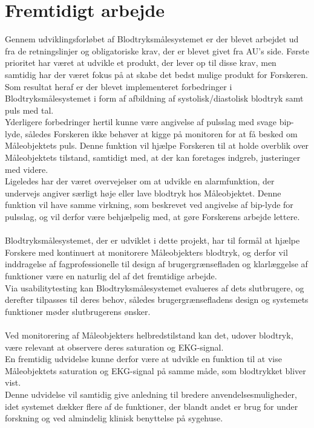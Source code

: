 \section{Fremtidigt arbejde}
Gennem udviklingsforløbet af Blodtryksmålesystemet er der blevet arbejdet ud fra de retningslinjer og obligatoriske krav, der er blevet givet fra AU’s side. Første prioritet har været at udvikle et produkt, der lever op til disse krav, men samtidig har der været fokus på at skabe det bedst mulige produkt for Forskeren. Som resultat heraf er der blevet implementeret forbedringer i Blodtryksmålesystemet i form af afbildning af systolisk/diastolisk blodtryk samt puls med tal. \\
Yderligere forbedringer hertil kunne være angivelse af pulsslag med svage bip-lyde, således Forskeren ikke behøver at kigge på monitoren for at få besked om Måleobjektets puls. Denne funktion vil hjælpe Forskeren til at holde overblik over Måleobjektets tilstand, samtidigt med, at der kan foretages indgreb, justeringer med videre. \\
Ligeledes har der været overvejelser om at udvikle en alarmfunktion, der undervejs angiver særligt høje eller lave blodtryk hos Måleobjektet.  Denne funktion vil have samme virkning, som beskrevet ved angivelse af bip-lyde for pulsslag, og vil derfor være behjælpelig med, at gøre Forskerens arbejde lettere.\\\\
Blodtryksmålesystemet, der er udviklet i dette projekt, har til formål at hjælpe Forskere med kontinuert at monitorere Måleobjekters blodtryk, og derfor vil inddragelse af fagprofessionelle til design af brugergrænsefladen og klarlæggelse af funktioner være en naturlig del af det fremtidige arbejde. \\
Via usabilitytesting kan Blodtryksmålesystemet evalueres af dets slutbrugere, og derefter tilpasses til deres behov, således brugergrænsefladens design og systemets funktioner møder slutbrugerens ønsker. \\ \\
Ved monitorering af Måleobjekters helbredstilstand kan det, udover blodtryk, være relevant at observere deres saturation og EKG-signal. \\ 
En fremtidig udvidelse kunne derfor være at udvikle en funktion til at vise Måleobjektets saturation og EKG-signal på samme måde, som blodtrykket bliver vist.\\
Denne udvidelse vil samtidig give anledning til bredere anvendelsesmuligheder, idet systemet dækker flere af de funktioner, der blandt andet er brug for under forskning og ved almindelig klinisk benyttelse på sygehuse. \\ \\
